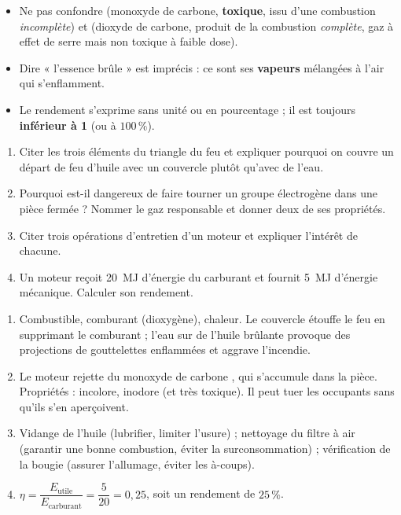 \documentclass[11pt]{article}
\begin{document}
\begin{attention}
\begin{itemize}
\item Ne pas confondre  (monoxyde de carbone, \textbf{toxique}, issu d'une combustion \emph{incomplète}) et  (dioxyde de carbone, produit de la combustion \emph{complète}, gaz à effet de serre mais non toxique à faible dose).
\item Dire « l'essence brûle » est imprécis : ce sont ses \textbf{vapeurs} mélangées à l'air qui s'enflamment.
\item Le rendement s'exprime sans unité ou en pourcentage ; il est toujours \textbf{inférieur à 1} (ou à $100\,\%$).
\end{itemize}
\end{attention}

\begin{exercice}
\begin{enumerate}
\item Citer les trois éléments du triangle du feu et expliquer pourquoi on couvre un départ de feu d'huile avec un couvercle plutôt qu'avec de l'eau.
\item Pourquoi est-il dangereux de faire tourner un groupe électrogène dans une pièce fermée ? Nommer le gaz responsable et donner deux de ses propriétés.
\item Citer trois opérations d'entretien d'un moteur et expliquer l'intérêt de chacune.
\item Un moteur reçoit \SI{20}{MJ} d'énergie du carburant et fournit \SI{5}{MJ} d'énergie mécanique. Calculer son rendement.
\end{enumerate}
\end{exercice}

\begin{corrige}[Exercice n]
\begin{enumerate}
\item Combustible, comburant (dioxygène), chaleur. Le couvercle étouffe le feu en supprimant le comburant ; l'eau sur de l'huile brûlante provoque des projections de gouttelettes enflammées et aggrave l'incendie.
\item Le moteur rejette du monoxyde de carbone , qui s'accumule dans la pièce. Propriétés : incolore, inodore (et très toxique). Il peut tuer les occupants sans qu'ils s'en aperçoivent.
\item Vidange de l'huile (lubrifier, limiter l'usure) ; nettoyage du filtre à air (garantir une bonne combustion, éviter la surconsommation) ; vérification de la bougie (assurer l'allumage, éviter les à-coups).
\item $\eta = \dfrac{E_{\text{utile}}}{E_{\text{carburant}}} = \dfrac{5}{20} = 0{,}25$, soit un rendement de $25\,\%$.
\end{enumerate}
\end{corrige}
\end{document}
